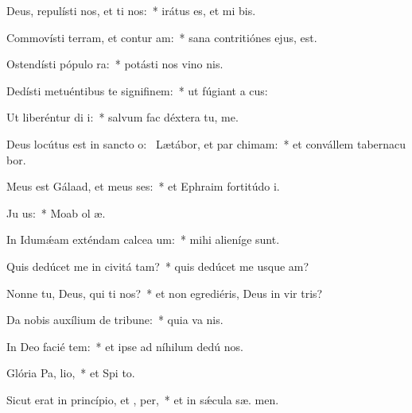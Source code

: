 \item Deus, repulísti nos, et ti nos:~* irátus es, et mi  bis.
\item Commovísti terram, et contur am:~* sana contritiónes ejus,   est.
\item Ostendísti pópulo  ra:~* potásti nos vino nis.
\item Dedísti metuéntibus te signifinem:~* ut fúgiant a  cus:
\item Ut liberéntur di i:~* salvum fac déxtera tu,   me.
\item Deus locútus est in sancto o:~\pscross{} Lætábor, et par chimam:~* et convállem tabernacu bor.
\item Meus est Gálaad, et meus  ses:~* et Ephraim fortitúdo  i.
\item Ju  us:~* Moab ol  æ.
\item In Idumǽam exténdam calcea um:~* mihi alieníge  sunt.
\item Quis dedúcet me in civitá tam?~* quis dedúcet me usque  am?
\item Nonne tu, Deus, qui ti nos?~* et non egrediéris, Deus in vir tris?
\item Da nobis auxílium de tribune:~* quia va  nis.
\item In Deo facié tem:~* et ipse ad níhilum dedú  nos.
\item Glória Pa,  lio,~* et Spi to.
\item Sicut erat in princípio, et ,  per,~* et in sǽcula sæ. men.
